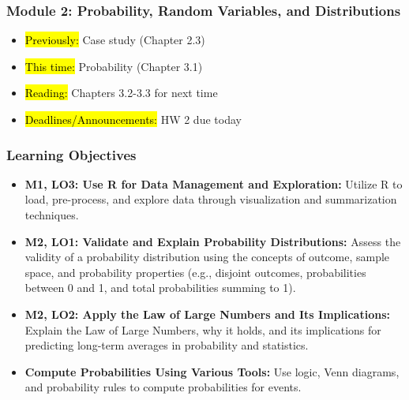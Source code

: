 
\begin{frame}
    \frametitle{Module 2: Probability, Random Variables, and Distributions}
    \begin{itemize}
        \item \hl{Previously: } Case study (Chapter 2.3)
        \item \hl{This time: } Probability (Chapter 3.1)
        \item \hl{Reading: } Chapters 3.2-3.3 for next time
        \item \hl{Deadlines/Announcements: } HW 2 due today
    \end{itemize}
    
\end{frame}

\begin{frame}
    \frametitle{Learning Objectives}
    \begin{itemize}
        \item \textbf{M1, LO3: Use R for Data Management and Exploration:} Utilize R to load, pre-process, and explore data through visualization and summarization techniques.
        \item \textbf{M2, LO1: Validate and Explain Probability Distributions:} Assess the validity of a probability distribution using the concepts of outcome, sample space, and probability properties (e.g., disjoint outcomes, probabilities between 0 and 1, and total probabilities summing to 1).
        \item \textbf{M2, LO2: Apply the Law of Large Numbers and Its Implications:} Explain the Law of Large Numbers, why it holds, and its implications for predicting long-term averages in probability and statistics.
        \item \textbf{Compute Probabilities Using Various Tools:} Use logic, Venn diagrams, and probability rules to compute probabilities for events.
    \end{itemize}
\end{frame}
